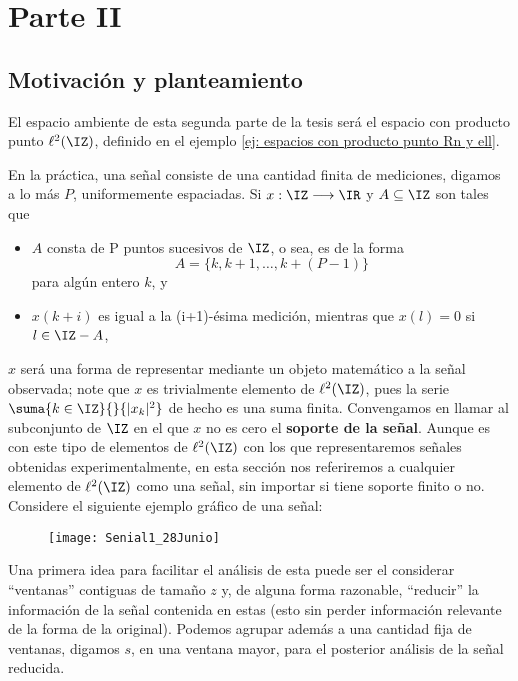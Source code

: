 


\chapter{Parte II}
\section{Motivación y planteamiento}
\label{sec: motivacion y planteamiento}
El espacio ambiente de esta segunda parte
de la tesis será el espacio
con producto punto $\ell^{2}(\IZ)$, definido en el ejemplo
\ref{ej: espacios con producto punto Rn y ell}.


En la práctica, una señal consiste de una cantidad
finita de mediciones, digamos a lo más $P$,
uniformemente espaciadas. Si $x: \IZ \longrightarrow \IR$
y $A \subseteq \IZ$ son tales que
\begin{itemize}
	\item $A$ consta de P puntos sucesivos
	de $\IZ$, o sea, es de la forma
	\[
	A=\{k, k+1, \ldots , k+(P-1)  \}
	\]
	para algún entero $k$, y
	\item $x(k+i)$ es igual a la (i+1)-ésima medición,
	mientras que $x(l)=0$ si $l \in \IZ -A$,
\end{itemize}

\noindent $x$ será una forma de representar mediante un objeto
matemático a la señal observada; note que $x$ es 
trivialmente elemento de $\ell^{2}(\IZ)$, pues
la serie $\suma{k \in \IZ}{}{|x_{k}|^{2}}$ de 
hecho es una suma finita. Convengamos en llamar
al subconjunto de $\IZ$ en el que
$x$ no es cero el \textbf{soporte de la señal}. Aunque
es con este tipo de elementos de $\ell^{2}(\IZ)$
con los que representaremos señales
obtenidas experimentalmente, en esta
sección nos referiremos a cualquier elemento de 
$\ell^{2}(\IZ)$ como una señal, sin importar si tiene
soporte finito o no. \\



Considere el siguiente ejemplo gráfico
de una señal:
\begin{figure}[H]
	\centering
	\texttt{[image: Senial1\_28Junio]}
\end{figure}
\noindent Una primera idea para facilitar el análisis de esta
puede ser el considerar 
``ventanas'' contiguas de tamaño $z$ y, de alguna forma 
razonable, ``reducir'' la información de la señal contenida 
en estas (esto sin perder
información relevante de la forma
de la original). Podemos agrupar además a una cantidad fija
de ventanas, digamos $s$, en una ventana mayor, para el 
posterior análisis de la señal reducida.


